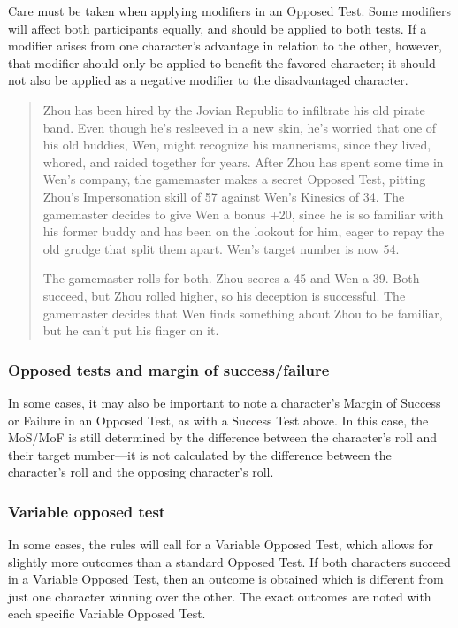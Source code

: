 Care must be taken when applying modifiers in an Opposed Test. Some modifiers will affect both participants equally, and should be applied to both tests. If a modifier arises from one character's advantage in relation to the other, however, that modifier should only be applied to benefit the favored character; it should not also be applied as a negative modifier to the disadvantaged character.

\begin{quotation}
Zhou has been hired by the Jovian Republic to infiltrate his old pirate band. Even though he's resleeved in a new skin, he's worried that one of his old buddies, Wen, might recognize his mannerisms, since they lived, whored, and raided together for years. After Zhou has spent some time in Wen's company, the gamemaster makes a secret Opposed Test, pitting Zhou's Impersonation skill of 57 against Wen's Kinesics of 34. The gamemaster decides to give Wen a bonus +20, since he is so familiar with his former buddy and has been on the lookout for him, eager to repay the old grudge that split them apart. Wen's target number is now 54.

 The gamemaster rolls for both. Zhou scores a 45 and Wen a 39. Both succeed, but Zhou rolled higher, so his deception is successful. The gamemaster decides that Wen finds something about Zhou to be familiar, but he can't put his finger on it.
\end{quotation}

\subsubsection{Opposed tests and margin of success/failure}
\label{sec:opposed-tests-margin}

In some cases, it may also be important to note a character's Margin of Success or Failure in an Opposed Test, as with a Success Test above. In this case, the MoS/MoF is still determined by the difference between the character's roll and their target number—it is not calculated by the difference between the character's roll and the opposing character's roll.

\subsubsection{Variable opposed test}
\label{sec:vari-oppos-test}

In some cases, the rules will call for a Variable Opposed Test, which allows for slightly more outcomes than a standard Opposed Test. If both characters succeed in a Variable Opposed Test, then an outcome is obtained which is different from just one character winning over the other. The exact outcomes are noted with each specific Variable Opposed Test.

